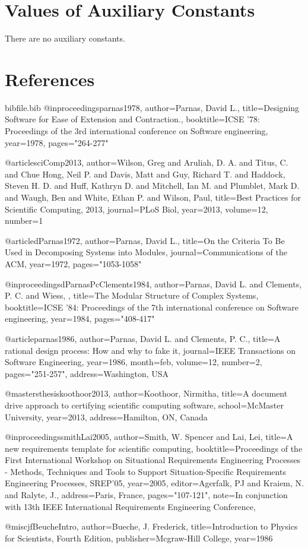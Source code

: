 \documentclass[12pt]{article}
\begin{document}
\section{Values of Auxiliary Constants}
\label{Sec:AuxConstants}
There are no auxiliary constants.
\section{References}
\label{Sec:References}
\begin{filecontents*}{bibfile.bib}
@inproceedings{parnas1978,
author={Parnas, David L.},
title={Designing Software for Ease of Extension and Contraction.},
booktitle={ICSE '78: Proceedings of the 3rd international conference on Software engineering},
year={1978},
pages={"264-277"}}

@article{sciComp2013,
author={Wilson, Greg and Aruliah, D. A. and Titus, C. and Chue Hong, Neil P. and Davis, Matt and Guy, Richard T. and Haddock, Steven H. D. and Huff, Kathryn D. and Mitchell, Ian M. and Plumblet, Mark D. and Waugh, Ben and White, Ethan P. and Wilson, Paul},
title={Best Practices for Scientific Computing, 2013},
journal={PLoS Biol},
year={2013},
volume={12},
number={1}}

@article{dParnas1972,
author={Parnas, David L.},
title={On the Criteria To Be Used in Decomposing Systems into Modules},
journal={Communications of the ACM},
year={1972},
pages={"1053-1058"}}

@inproceedings{dParnasPcClements1984,
author={Parnas, David L. and Clements, P. C. and Wiess, },
title={The Modular Structure of Complex Systems},
booktitle={ICSE '84: Proceedings of the 7th international conference on Software engineering},
year={1984},
pages={"408-417"}}

@article{parnas1986,
author={Parnas, David L. and Clements, P. C.},
title={A rational design process: How and why to fake it},
journal={IEEE Transactions on Software Engineering},
year={1986},
month={feb},
volume={12},
number={2},
pages={"251-257"},
address={Washington, USA}}

@mastersthesis{koothoor2013,
author={Koothoor, Nirmitha},
title={A document drive approach to certifying scientific computing software},
school={McMaster University},
year={2013},
address={Hamilton, ON, Canada}}

@inproceedings{smithLai2005,
author={Smith, W. Spencer and Lai, Lei},
title={A new requirements template for scientific computing},
booktitle={Proceedings of the First International Workshop on Situational Requirements Engineering Processes - Methods, Techniques and Tools to Support Situation-Specific Requirements Engineering Processes, SREP'05},
year={2005},
editor={Agerfalk, PJ and Kraiem, N. and Ralyte, J.},
address={Paris, France},
pages={"107-121"},
note={In conjunction with 13th IEEE International Requirements Engineering Conference,}}

@misc{jfBeucheIntro,
author={Bueche, J. Frederick},
title={Introduction to Physics for Scientists, Fourth Edition},
publisher={Mcgraw-Hill College},
year={1986}}
\end{filecontents*}
\nocite{*}
\printbibliography[heading=none]
\end{document}
